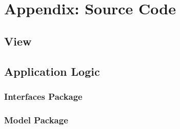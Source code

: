 \chapter{Appendix: Source Code}
\label{appendix}

\section{View}
\label{app:view}





\section{Application Logic}
\label{applog}

\subsection{Interfaces Package}
\label{al:ip}











\subsection{Model Package}
\label{al:mp}









